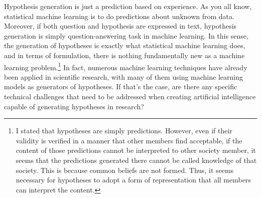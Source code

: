 \documentclass{article}
\begin{document}

Hypothesis generation is just a prediction based on experience. As you all know, statistical machine learning is to do predictions about unknown from data. Moreover, if both question and hypothesis are expressed in text, hypothesis generation is simply question-answering task in machine learning. In this sense, the generation of hypotheses is exactly what statistical machine learning does, and in terms of formulation, there is nothing fundamentally new as a machine learning problem.\footnote{
I stated that hypotheses are simply predictions. However, even if their validity is verified in a manner that other members find acceptable, if the content of those predictions cannot be interpreted to other society member, it seems that the predictions generated there cannot be called knowledge of that society. This is because common beliefs are not formed. Thus, it seems necessary for hypotheses to adopt a form of representation that all members can interpret the content.
} In fact, numerous machine learning techniques have already been applied in scientific research, with many of them using machine learning models as generators of hypotheses. If that's the case, are there any specific technical challenges that need to be addressed when creating artificial intelligence capable of generating hypotheses in research? 

\end{document}
